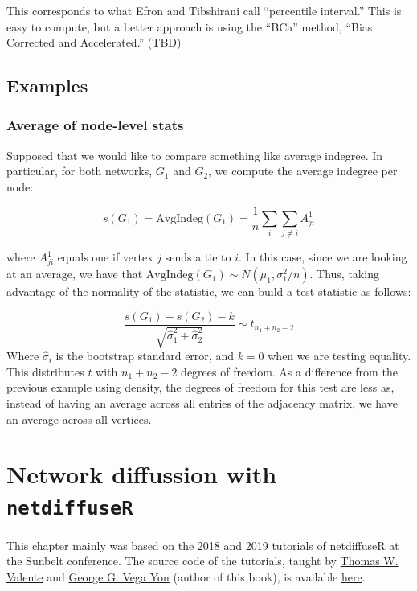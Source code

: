\documentclass[]{book}
\begin{document}
This corresponds to what Efron and Tibshirani call ``percentile interval.''
This is easy to compute, but a better approach is using the ``BCa'' method,
``Bias Corrected and Accelerated.'' (TBD)

\hypertarget{examples}{%
\section{Examples}\label{examples}}

\hypertarget{average-of-node-level-stats}{%
\subsection{Average of node-level stats}\label{average-of-node-level-stats}}

Supposed that we would like to compare something like average indegree.
In particular, for both networks, \(G_1\) and \(G_2\), we compute the average
indegree per node:

\[
s(G_1) = \mbox{AvgIndeg}(G_1) = \frac{1}{n}\sum_{i}\sum_{j\neq i}A^1_{ji}
\]

\noindent where \(A^1_{ji}\) equals one if vertex \(j\) sends a tie to \(i\). In this
case, since we are looking at an average, we have that
\(\mbox{AvgIndeg}(G_1) \sim N(\mu_1, \sigma^2_1/n)\). Thus, taking advantage of
the normality of the statistic, we can build a test statistic as follows:

\[
\frac{s(G_1) - s(G_2) - k}{\sqrt{\hat\sigma_{1}^2 + \hat\sigma_{2}^2}} \sim t_{n_1 + n_2 - 2}
\]
Where \(\hat\sigma_i\) is the bootstrap standard error, and \(k = 0\) when we are testing
equality. This distributes \(t\) with
\(n_1+n_2-2\) degrees of freedom. As a difference from the previous example using
density, the degrees of freedom for this test are less as, instead of having an
average across all entries of the adjacency matrix, we have an average across all
vertices.

\hypertarget{network-diffussion-with-netdiffuser}{%
\chapter{\texorpdfstring{Network diffussion with \texttt{netdiffuseR}}{Network diffussion with netdiffuseR}}\label{network-diffussion-with-netdiffuser}}

This chapter mainly was based on the 2018 and 2019 tutorials of netdiffuseR
at the Sunbelt conference. The source code of the tutorials, taught by \href{https://keck.usc.edu/faculty-search/thomas-william-valente/}{Thomas W. Valente}
and \href{https://ggvy.cl}{George G. Vega Yon} (author of this book), is available \href{https://github.com/USCCANA/netdiffuser-sunbelt2018/tree/sunbelt2019}{here}.
\end{document}
